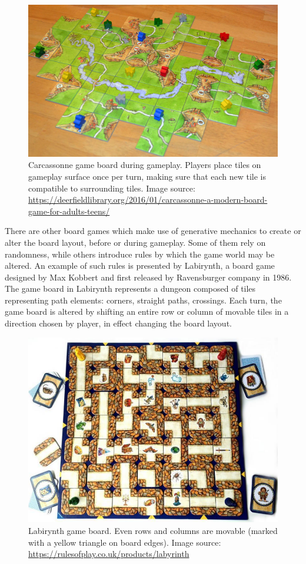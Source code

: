 \documentclass[12pt]{report}
\begin{document}
\begin{figure}[H]
	\centering
	\includegraphics[width=0.7\linewidth]{images/carcassonne}
	\caption{Carcassonne game board during gameplay. Players place tiles on gameplay surface once per turn, making sure that each new tile is compatible to surrounding tiles. Image source: \url{https://deerfieldlibrary.org/2016/01/carcassonne-a-modern-board-game-for-adults-teens/}}
	\label{fig:carcassonne}
\end{figure}

There are other board games which make use of generative mechanics to create or alter the board layout, before or during gameplay. Some of them rely on randomness, while others introduce rules by which the game world may be altered. An example of such rules is presented by Labirynth, a board game designed by Max Kobbert and first released by Ravensburger company in 1986. The game board in Labirynth represents a dungeon composed of tiles representing path elements: corners, straight paths, crossings. Each turn, the game board is altered by shifting an entire row or column of movable tiles in a direction chosen by player, in effect changing the board layout.  

 \begin{figure}[H]
 	\centering
 	\includegraphics[width=0.7\linewidth]{images/labirynth}
 	\caption{Labirynth game board. Even rows and columns are movable (marked with a yellow triangle on board edges). Image source: \url{https://rulesofplay.co.uk/products/labyrinth} }
 	\label{fig:carcassonne}
 \end{figure}
\end{document}
